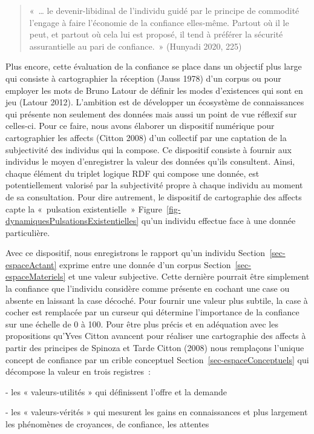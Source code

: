 \documentclass[
  letterpaper,
  DIV=11,
  numbers=noendperiod]{scrreprt}
\begin{document}
\begin{quote}
«~\ldots{} le devenir-libidinal de l'individu guidé par le principe de
commodité l'engage à faire l'économie de la confiance elles-même.
Partout où il le peut, et partout où cela lui est proposé, il tend à
préférer la sécurité assurantielle au pari de confiance.~» (Hunyadi
2020, 225)
\end{quote}

Plus encore, cette évaluation de la confiance se place dans un objectif
plus large qui consiste à cartographier la réception (Jauss 1978) d'un
corpus ou pour employer les mots de Bruno Latour de définir les modes
d'existences qui sont en jeu (Latour 2012). L'ambition est de développer
un écosystème de connaissances qui présente non seulement des données
mais aussi un point de vue réflexif sur celles-ci. Pour ce faire, nous
avons élaborer un dispositif numérique pour cartographier les affects
(Citton 2008) d'un collectif par une captation de la subjectivité des
individus qui la compose. Ce dispositif consiste à fournir aux individus
le moyen d'enregistrer la valeur des données qu'ils consultent. Ainsi,
chaque élément du triplet logique RDF qui compose une donnée, est
potentiellement valorisé par la subjectivité propre à chaque individu au
moment de sa consultation. Pour dire autrement, le dispositif de
cartographie des affects capte la «~pulsation existentielle~»
Figure~\ref{fig-dynamiquesPulsationsExistentielles} qu'un individu
effectue face à une donnée particulière.

Avec ce dispositif, nous enregistrons le rapport qu'un individu
Section~\ref{sec-espaceActant} exprime entre une donnée d'un corpus
Section~\ref{sec-espaceMateriels} et une valeur subjective. Cette
dernière pourrait être simplement la confiance que l'individu considère
comme présente en cochant une case ou absente en laissant la case
décoché. Pour fournir une valeur plus subtile, la case à cocher est
remplacée par un curseur qui détermine l'importance de la confiance sur
une échelle de 0 à 100. Pour être plus précis et en adéquation avec les
propositions qu'Yves Citton avancent pour réaliser une cartographie des
affects à partir des principes de Spinoza et Tarde Citton (2008) nous
remplaçons l'unique concept de confiance par un crible conceptuel
Section~\ref{sec-espaceConceptuels} qui décompose la valeur en trois
registres~:

- les « valeurs-utilités » qui définissent l'offre et la demande

- les « valeurs-vérités » qui mesurent les gains en connaissances et
plus largement les phénomènes de croyances, de confiance, les attentes
\end{document}
